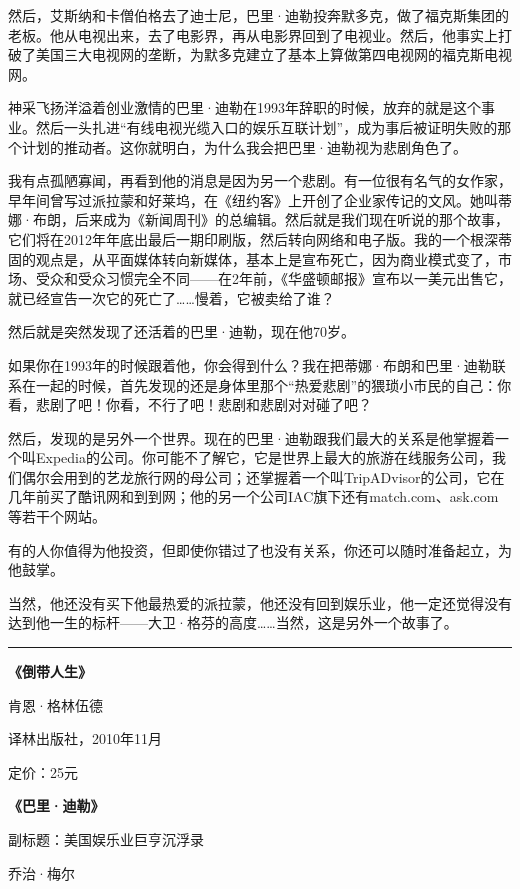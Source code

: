 然后，艾斯纳和卡僧伯格去了迪士尼，巴里·迪勒投奔默多克，做了福克斯集团的老板。他从电视出来，去了电影界，再从电影界回到了电视业。然后，他事实上打破了美国三大电视网的垄断，为默多克建立了基本上算做第四电视网的福克斯电视网。

神采飞扬洋溢着创业激情的巴里·迪勒在1993年辞职的时候，放弃的就是这个事业。然后一头扎进``有线电视光缆入口的娱乐互联计划''，成为事后被证明失败的那个计划的推动者。这你就明白，为什么我会把巴里·迪勒视为悲剧角色了。

我有点孤陋寡闻，再看到他的消息是因为另一个悲剧。有一位很有名气的女作家，早年间曾写过派拉蒙和好莱坞，在《纽约客》上开创了企业家传记的文风。她叫蒂娜·布朗，后来成为《新闻周刊》的总编辑。然后就是我们现在听说的那个故事，它们将在2012年年底出最后一期印刷版，然后转向网络和电子版。我的一个根深蒂固的观点是，从平面媒体转向新媒体，基本上是宣布死亡，因为商业模式变了，市场、受众和受众习惯完全不同------在2年前，《华盛顿邮报》宣布以一美元出售它，就已经宣告一次它的死亡了\ldots{}\ldots{}慢着，它被卖给了谁？

然后就是突然发现了还活着的巴里·迪勒，现在他70岁。

如果你在1993年的时候跟着他，你会得到什么？我在把蒂娜·布朗和巴里·迪勒联系在一起的时候，首先发现的还是身体里那个``热爱悲剧''的猥琐小市民的自己：你看，悲剧了吧！你看，不行了吧！悲剧和悲剧对对碰了吧？

然后，发现的是另外一个世界。现在的巴里·迪勒跟我们最大的关系是他掌握着一个叫Expedia的公司。你可能不了解它，它是世界上最大的旅游在线服务公司，我们偶尔会用到的艺龙旅行网的母公司；还掌握着一个叫TripADvisor的公司，它在几年前买了酷讯网和到到网；他的另一个公司IAC旗下还有match.com、ask.com等若干个网站。

有的人你值得为他投资，但即使你错过了也没有关系，你还可以随时准备起立，为他鼓掌。

当然，他还没有买下他最热爱的派拉蒙，他还没有回到娱乐业，他一定还觉得没有达到他一生的标杆------大卫·格芬的高度\ldots{}\ldots{}当然，这是另外一个故事了。

\begin{center}\rule{3in}{0.4pt}\end{center}

\textbf{《倒带人生》}

肯恩·格林伍德

译林出版社，2010年11月

定价：25元

\textbf{《巴里·迪勒》}

副标题：美国娱乐业巨亨沉浮录

乔治·梅尔

